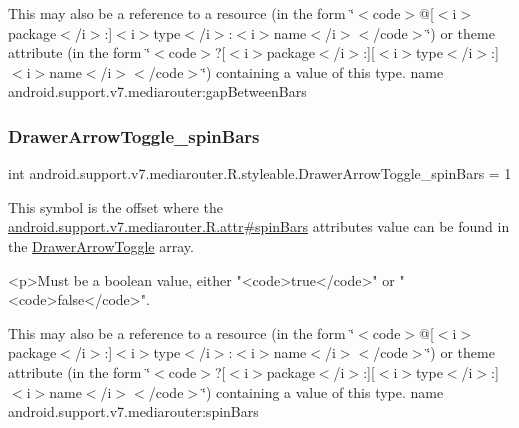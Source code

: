 This may also be a reference to a resource (in the form \char`\"{}$<$code$>$@\mbox{[}$<$i$>$package$<$/i$>$\+:\mbox{]}$<$i$>$type$<$/i$>$\+:$<$i$>$name$<$/i$>$$<$/code$>$\char`\"{}) or theme attribute (in the form \char`\"{}$<$code$>$?\mbox{[}$<$i$>$package$<$/i$>$\+:\mbox{]}\mbox{[}$<$i$>$type$<$/i$>$\+:\mbox{]}$<$i$>$name$<$/i$>$$<$/code$>$\char`\"{}) containing a value of this type.  name android.\+support.\+v7.\+mediarouter\+:gap\+Between\+Bars \mbox{\label{classandroid_1_1support_1_1v7_1_1mediarouter_1_1R_1_1styleable_aae8cdc41456778b50a759a297ff28dad}} 
\subsubsection{\texorpdfstring{Drawer\+Arrow\+Toggle\+\_\+spin\+Bars}{DrawerArrowToggle\_spinBars}}
{\footnotesize\ttfamily int android.\+support.\+v7.\+mediarouter.\+R.\+styleable.\+Drawer\+Arrow\+Toggle\+\_\+spin\+Bars = 1\hspace{0.3cm}{\ttfamily [static]}}

This symbol is the offset where the \hyperlink{classandroid_1_1support_1_1v7_1_1mediarouter_1_1R_1_1attr_aa260067bb070619d75ad966a1c005ae3}{android.\+support.\+v7.\+mediarouter.\+R.\+attr\#spin\+Bars} attribute\textquotesingle{}s value can be found in the \hyperlink{classandroid_1_1support_1_1v7_1_1mediarouter_1_1R_1_1styleable_a71030bdd9f81aafe32f56767ba04e5b0}{Drawer\+Arrow\+Toggle} array.

\begin{DoxyVerb}      <p>Must be a boolean value, either "<code>true</code>" or "<code>false</code>".
\end{DoxyVerb}
 

This may also be a reference to a resource (in the form \char`\"{}$<$code$>$@\mbox{[}$<$i$>$package$<$/i$>$\+:\mbox{]}$<$i$>$type$<$/i$>$\+:$<$i$>$name$<$/i$>$$<$/code$>$\char`\"{}) or theme attribute (in the form \char`\"{}$<$code$>$?\mbox{[}$<$i$>$package$<$/i$>$\+:\mbox{]}\mbox{[}$<$i$>$type$<$/i$>$\+:\mbox{]}$<$i$>$name$<$/i$>$$<$/code$>$\char`\"{}) containing a value of this type.  name android.\+support.\+v7.\+mediarouter\+:spin\+Bars \mbox{\label{classandroid_1_1support_1_1v7_1_1mediarouter_1_1R_1_1styleable_afe1e37e12d66a5326cf5638f522e86fd}} 
